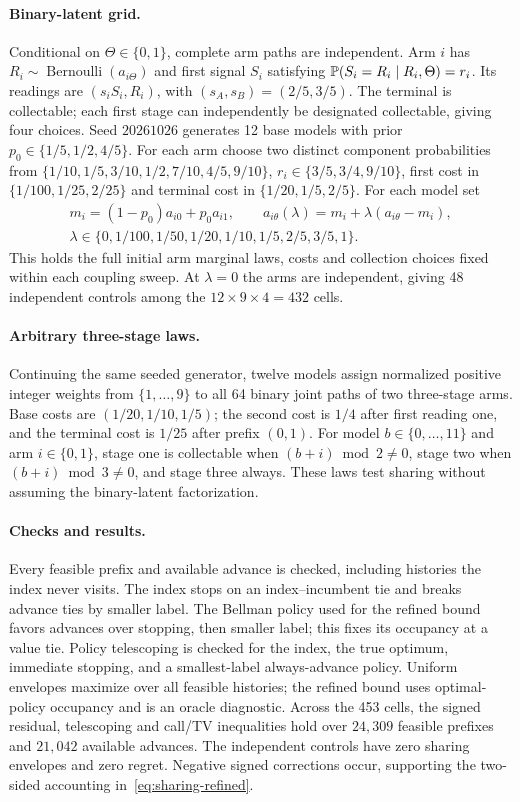 \paragraph{Binary-latent grid.}
Conditional on $\Theta\in\{0,1\}$, complete arm paths are independent.
Arm $i$ has $R_i\sim\operatorname{Bernoulli}(a_{i\Theta})$ and first signal
$S_i$ satisfying $\mathbb{P}(S_i=R_i\mid R_i,\Theta)=r_i$. Its readings are
$(s_iS_i,R_i)$, with $(s_A,s_B)=(2/5,3/5)$. The terminal is collectable;
each first stage can independently be designated collectable, giving four choices.
Seed $20261026$ generates 12 base models with prior $p_0\in\{1/5,1/2,4/5\}$.
For each arm choose two distinct component probabilities from
$\{1/10,1/5,3/10,1/2,7/10,4/5,9/10\}$, $r_i\in\{3/5,3/4,9/10\}$,
first cost in $\{1/100,1/25,2/25\}$ and terminal cost in $\{1/20,1/5,2/5\}$.
For each model set
\[
\begin{gathered}
 m_i=(1-p_0)a_{i0}+p_0a_{i1},\qquad
 a_{i\theta}(\lambda)=m_i+\lambda(a_{i\theta}-m_i),\\
 \lambda\in\{0,1/100,1/50,1/20,1/10,1/5,2/5,3/5,1\}.
\end{gathered}
\]
This holds the full initial arm marginal laws, costs and collection choices
fixed within each coupling sweep. At $\lambda=0$ the arms are independent,
giving 48 independent controls among the $12\times9\times4=432$ cells.

\paragraph{Arbitrary three-stage laws.}
Continuing the same seeded generator, twelve models assign normalized positive
integer weights from $\{1,\ldots,9\}$ to all 64 binary joint paths of two
three-stage arms. Base costs are $(1/20,1/10,1/5)$; the second cost is $1/4$
after first reading one, and the terminal cost is $1/25$ after prefix $(0,1)$.
For model $b\in\{0,\ldots,11\}$ and arm $i\in\{0,1\}$, stage one is
collectable when $(b+i)\bmod2\ne0$, stage two when $(b+i)\bmod3\ne0$, and
stage three always. These laws test sharing without assuming the binary-latent factorization.

\paragraph{Checks and results.}
Every feasible prefix and available advance is checked, including histories
the index never visits. The index stops on an index--incumbent tie and breaks
advance ties by smaller label. The Bellman policy used for the refined bound
favors advances over stopping, then smaller label; this fixes its occupancy at
a value tie. Policy telescoping is checked for the index, the true optimum,
immediate stopping, and a smallest-label always-advance policy.
Uniform envelopes maximize over all feasible histories; the refined bound
uses optimal-policy occupancy and is an oracle diagnostic.
Across the 453 cells, the signed residual, telescoping and call/TV inequalities
hold over $24{,}309$ feasible prefixes and $21{,}042$ available advances.
The independent controls have zero sharing envelopes and zero regret.
Negative signed corrections occur, supporting the two-sided accounting
in~\eqref{eq:sharing-refined}.

